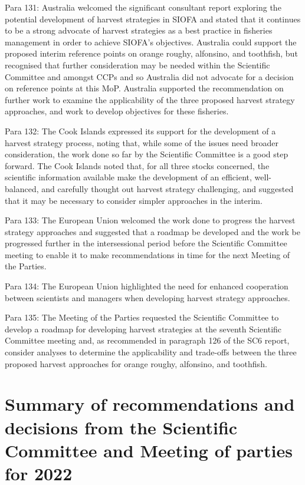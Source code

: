 Para 131: Australia welcomed the significant consultant report exploring the potential development of harvest strategies in SIOFA and stated that it continues to be a strong advocate of harvest strategies as a best practice in fisheries management in order to achieve SIOFA’s objectives. Australia could support the proposed interim reference points on orange roughy, alfonsino, and toothfish, but recognised that further consideration may be needed within the Scientific Committee and amongst CCPs and so Australia did not advocate for a decision on reference points at this MoP. Australia supported the recommendation on further work to examine the applicability of the three proposed harvest strategy approaches, and work to develop objectives for these fisheries.

Para 132: The Cook Islands expressed its support for the development of a harvest strategy process, noting that, while some of the issues need broader consideration, the work done so far by the Scientific Committee is a good step forward. The Cook Islands noted that, for all three stocks concerned, the scientific information available make the development of an efficient, well-balanced, and carefully thought out harvest strategy challenging, and suggested that it may be necessary to consider simpler approaches in the interim.

Para 133: The European Union welcomed the work done to progress the harvest strategy approaches and suggested that a roadmap be developed and the work be progressed further in the intersessional period before the Scientific Committee meeting to enable it to make recommendations in time for the next Meeting of the Parties.

Para 134: The European Union highlighted the need for enhanced cooperation between scientists and managers when developing harvest strategy approaches.

Para 135: The Meeting of the Parties requested the Scientific Committee to develop a roadmap for developing harvest strategies at the seventh Scientific Committee meeting and, as recommended in paragraph 126 of the SC6 report, consider analyses to determine the applicability and trade-offs between the three proposed harvest approaches for orange roughy, alfonsino, and toothfish.

\section{Summary of recommendations and decisions from the Scientific Committee and Meeting of parties for 2022}

